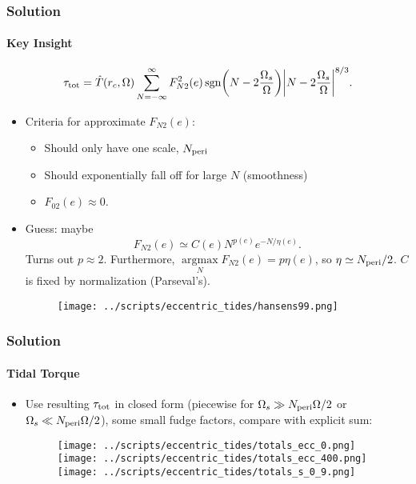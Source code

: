 \documentclass[dvipsnames,8pt]{beamer}
\DeclareMathOperator*{\argmax}{argmax}
\DeclareMathOperator{\sgn}{sgn}
\DeclarePairedDelimiter\abs{\lvert}{\rvert}
\DeclarePairedDelimiter\p{\lparen}{\rparen}
\begin{document}
\begin{frame}
    \frametitle{Solution}
    \framesubtitle{Key Insight}
    \begin{equation*}
        \tau_{\rm tot} = \hat{T}(r_c, \Omega)
            \sum\limits_{N = -\infty}^\infty F_{N2}^2(e)
                \sgn\p*{N - 2\frac{\Omega_s}{\Omega}}
                \abs*{N - 2\frac{\Omega_s}{\Omega}}^{8/3}.
    \end{equation*}

    \begin{itemize}
        \item Criteria for approximate $F_{N2}(e)$:
        \begin{itemize}
            \item Should only have one scale, $N_{\rm peri}$
            \item Should exponentially fall off for large $N$ (smoothness)
            \item $F_{02}(e) \approx 0$.
        \end{itemize}

        \item Guess: maybe
            \begin{equation}
                F_{N2}(e) \simeq C(e) N^{p(e)} e^{-N / \eta(e)}.
            \end{equation}
            Turns out $p \approx 2$. Furthermore, $\argmax\limits_N F_{N2}(e) =
            p\eta(e)$, so $\eta \simeq N_{\rm peri} / 2$. $C$ is fixed by
            normalization (Parseval's).
        \begin{figure}[h]
            \centering
            \texttt{[image: ../scripts/eccentric\_tides/hansens99.png]}
        \end{figure}
    \end{itemize}
\end{frame}

\begin{frame}
    \frametitle{Solution}
    \framesubtitle{Tidal Torque}

    \begin{itemize}
        \item Use resulting $\tau_{\rm tot}$ in closed form (piecewise for
            $\Omega_s \gg N_{\rm peri}\Omega / 2$ or $\Omega_s \ll N_{\rm
            peri}\Omega / 2$), some small fudge factors, compare with explicit
            sum:
            \begin{figure}[h]
                \centering
                \texttt{[image: ../scripts/eccentric\_tides/totals\_ecc\_0.png]}
                \texttt{[image: ../scripts/eccentric\_tides/totals\_ecc\_400.png]}
                \texttt{[image: ../scripts/eccentric\_tides/totals\_s\_0\_9.png]}
            \end{figure}
    \end{itemize}
\end{frame}
\end{document}
